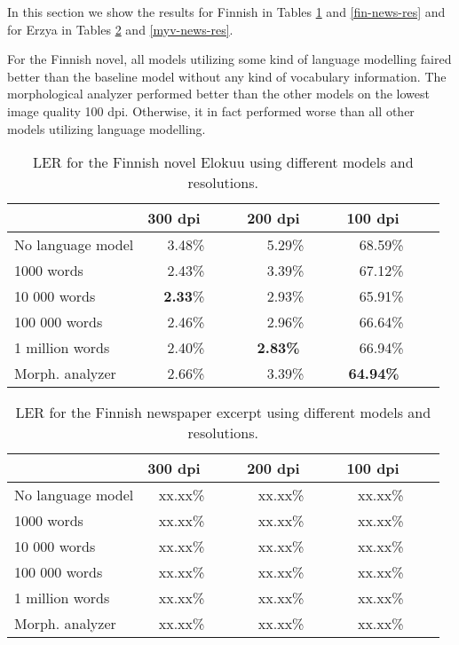 \documentclass[b5paper]{article}
\begin{document}
In this section we show the results for Finnish in Tables
\ref{fin-novel-res} and \ref{fin-news-res} and for Erzya in Tables
\ref{myv-novel-res} and \ref{myv-news-res}. 

For the Finnish novel, all models utilizing some kind of language
modelling faired better than the baseline model without any kind of
vocabulary information. The morphological analyzer performed better
than the other models on the lowest image quality 100 dpi. Otherwise,
it in fact performed worse than all other models utilizing language
modelling.

\begin{table}[!htb]
\begin{center}
\begin{tabular}{lrrr}
\hline 
                  & 300 dpi~~~~ & 200 dpi~~~~ & 100 dpi~~~~ \\
\hline 
No language model & ~3.48\%~~~~         & ~5.29\%~~~~         & 68.59\%~~~~         \\
1000 words        & ~2.43\%~~~~         & ~3.39\%~~~~         & 67.12\%~~~~         \\
10 000 words      & {\bf ~2.33}\%~~~~   & ~2.93\%~~~~         & 65.91\%~~~~         \\
100 000 words     & ~2.46\%~~~~         & ~2.96\%~~~~         & 66.64\%~~~~         \\
1 million words   & ~2.40\%~~~~         & {\bf ~2.83\%~~~~}   & 66.94\%~~~~         \\
Morph. analyzer   & ~2.66\%~~~~         & ~3.39\%~~~~         & {\bf 64.94\%~~~~}   \\
\hline 
\end{tabular}
\caption{LER for the Finnish novel Elokuu using different models and resolutions.}\label{fin-novel-res}
\end{center}
\end{table}

\begin{table}[!htb]
\begin{center}
\begin{tabular}{lrrr}
\hline 
                  & 300 dpi~~~~ & 200 dpi~~~~ & 100 dpi~~~~ \\
\hline 
No language model & xx.xx\%~~~~   & xx.xx\%~~~~   & xx.xx\%~~~~   \\
1000 words        & xx.xx\%~~~~   & xx.xx\%~~~~   & xx.xx\%~~~~   \\
10 000 words      & xx.xx\%~~~~   & xx.xx\%~~~~   & xx.xx\%~~~~   \\
100 000 words     & xx.xx\%~~~~   & xx.xx\%~~~~   & xx.xx\%~~~~   \\
1 million words   & xx.xx\%~~~~   & xx.xx\%~~~~   & xx.xx\%~~~~   \\
Morph. analyzer   & xx.xx\%~~~~   & xx.xx\%~~~~   & xx.xx\%~~~~   \\
\hline 
\end{tabular}
\caption{LER for the Finnish newspaper excerpt using different models and resolutions.}\label{myv-novel-res}
\end{center}
\end{table}
\end{document}
